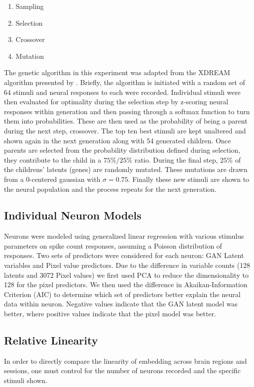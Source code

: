 \begin{enumerate}
	\item Sampling
	\item Selection
	\item Crossover
	\item Mutation
\end{enumerate}

The genetic algorithm in this experiment was adapted from the XDREAM algorithm presented by \cite{Ponce2019}. Briefly, the algorithm is initiated with a random set of 64 stimuli and neural responses to each were recorded. Individual stimuli were then evaluated for optimality during the selection step by z-scoring neural responses within generation and then passing through a softmax function to turn them into probabilities. These are then used as the probability of being a parent during the next step, crossover. The top ten best stimuli are kept unaltered and shown again in the next generation along with 54 generated children. Once parents are selected from the probability distribution defined during selection, they contribute to the child in a $75\%/25\%$ ratio. During the final step, $25\%$ of the childrens' latents (genes) are randomly mutated. These mutations are drawn from a 0-centered gaussian with $\sigma=0.75$. Finally these new stimuli are shown to the neural population and the process repeats for the next generation.

\subsection{Individual Neuron Models}
Neurons were modeled using generalized linear regression with various stimulus parameters on spike count responses, assuming a Poisson distribution of responses. Two sets of predictors were considered for each neuron: GAN Latent variables and Pixel value predictors. Due to the difference in variable counts (128 latents and 3072 Pixel values) we first used PCA to reduce the dimensionality to 128 for the pixel predictors. We then used the difference in Akaikan-Information Criterion (AIC) to determine which set of predictors better explain the neural data within neuron.
Negative values indicate that the GAN latent model was better, where positive values indicate that the pixel model was better. 

\subsection{Relative Linearity}
\label{methods:relativeLinearity}
In order to directly compare the linearity of embedding across brain regions and sessions, one must control for the number of neurons recorded and the specific stimuli shown.

